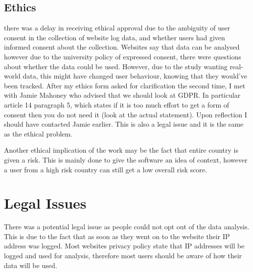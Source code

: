 \subsection{Ethics}
there was a delay in receiving ethical approval due to the ambiguity of user consent in the collection of website log data, and whether users had given informed consent about the collection. Websites say that data can be analysed however due to the university policy of expressed consent, there were questions about whether the data could be used. However, due to the study wanting real-world data, this might have changed user behaviour, knowing that they would've been tracked. After my ethics form asked for clarification the second time, I met with Jamie Mahoney who advised that we should look at GDPR. In particular article 14 paragraph 5, which states if it is too much effort to get a form of consent then you do not need it (look at the actual statement). Upon reflection I should have contacted Jamie earlier. This is also a legal issue and it is the same as the ethical problem.

Another ethical implication of the work may be the fact that  entire country is given a risk. This is mainly done to give the software an idea of context, however a user from a high risk country can still get a low overall risk score.

\section{Legal Issues}
There was a potential legal issue as people could not opt out of the data analysis. This is due to the fact that as soon as they went on to the website their IP address was logged. Most websites privacy policy state that IP addresses will be logged and used for analysis, therefore most users should be aware of how their data will be used.